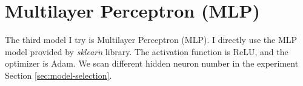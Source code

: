 \section{Multilayer Perceptron (MLP)}
\label{sec:mlp}

The third model I try is Multilayer Perceptron (MLP).
I directly use the MLP model provided by \textit{sklearn} library.
The activation function is ReLU, and the optimizer is Adam.
We scan different hidden neuron number in the experiment Section \ref{sec:model-selection}.